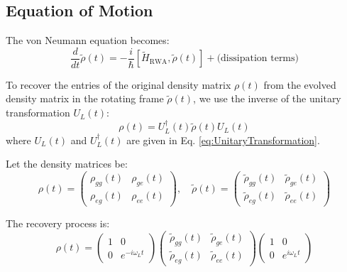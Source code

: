 \subsection*{Equation of Motion}

The von Neumann equation becomes:
\begin{equation}
	\frac{d}{dt} \tilde{\rho}(t) = -\frac{i}{\hbar} [\tilde{H}_{\text{RWA}}, \tilde{\rho}(t)] + \text{(dissipation terms)}
	\label{eq:VonNeumannEquationRWA}
\end{equation}

To recover the entries of the original density matrix \(\rho(t)\) from the evolved density matrix in the rotating frame \(\tilde{\rho}(t)\), we use the inverse of the unitary transformation \(U_L(t)\):
\begin{equation}
	\rho(t) = U_L^\dagger(t) \tilde{\rho}(t) U_L(t)
	\label{eq:RecoverOriginalDensityMatrix}
\end{equation}
where \(U_L(t)\) and \(U_L^\dagger(t)\) are given in Eq. \eqref{eq:UnitaryTransformation}.

Let the density matrices be:
\begin{equation}
	\rho(t) =
	\begin{pmatrix}
		\rho_{gg}(t) & \rho_{ge}(t) \\
		\rho_{eg}(t) & \rho_{ee}(t)
	\end{pmatrix}, \quad
	\tilde{\rho}(t) =
	\begin{pmatrix}
		\tilde{\rho}_{gg}(t) & \tilde{\rho}_{ge}(t) \\
		\tilde{\rho}_{eg}(t) & \tilde{\rho}_{ee}(t)
	\end{pmatrix}
	\label{eq:DensityMatrices}
\end{equation}

The recovery process is:
\begin{equation}
	\rho(t) =
	\begin{pmatrix}
		1 & 0                \\
		0 & e^{-i\omega_L t}
	\end{pmatrix}
	\begin{pmatrix}
		\tilde{\rho}_{gg}(t) & \tilde{\rho}_{ge}(t) \\
		\tilde{\rho}_{eg}(t) & \tilde{\rho}_{ee}(t)
	\end{pmatrix}
	\begin{pmatrix}
		1 & 0               \\
		0 & e^{i\omega_L t}
	\end{pmatrix}
	\label{eq:RecoveryProcess}
\end{equation}

